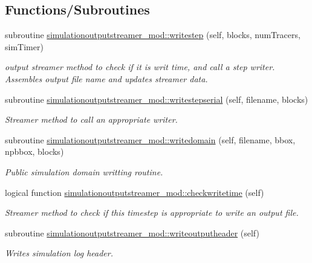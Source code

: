 \subsection*{Functions/\+Subroutines}
\begin{DoxyCompactItemize}
\item 
subroutine \mbox{\hyperlink{namespacesimulationoutputstreamer__mod_a689f65c821b78d46b142653214338b85}{simulationoutputstreamer\+\_\+mod\+::writestep}} (self, blocks, num\+Tracers, sim\+Timer)
\begin{DoxyCompactList}\small\item\em output streamer method to check if it is writ time, and call a step writer. Assembles output file name and updates streamer data. \end{DoxyCompactList}\item 
subroutine \mbox{\hyperlink{namespacesimulationoutputstreamer__mod_af116b4ea9abff9117b9b1b9b5e6ab690}{simulationoutputstreamer\+\_\+mod\+::writestepserial}} (self, filename, blocks)
\begin{DoxyCompactList}\small\item\em Streamer method to call an appropriate writer. \end{DoxyCompactList}\item 
subroutine \mbox{\hyperlink{namespacesimulationoutputstreamer__mod_a2c660b4331c576befebcf037b82b8d7a}{simulationoutputstreamer\+\_\+mod\+::writedomain}} (self, filename, bbox, npbbox, blocks)
\begin{DoxyCompactList}\small\item\em Public simulation domain writting routine. \end{DoxyCompactList}\item 
logical function \mbox{\hyperlink{namespacesimulationoutputstreamer__mod_a81b788c12b0520901e6fc9b113a10dec}{simulationoutputstreamer\+\_\+mod\+::checkwritetime}} (self)
\begin{DoxyCompactList}\small\item\em Streamer method to check if this timestep is appropriate to write an output file. \end{DoxyCompactList}\item 
subroutine \mbox{\hyperlink{namespacesimulationoutputstreamer__mod_a6f01bdc663fe5f4a842150a6aac90f67}{simulationoutputstreamer\+\_\+mod\+::writeoutputheader}} (self)
\begin{DoxyCompactList}\small\item\em Writes simulation log header. \end{DoxyCompactList}\item 

\end{DoxyCompactItemize}
